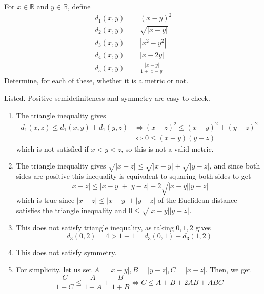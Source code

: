   \begin{exercise}[Rudin 2.11]
    For $x \in \mathbb{R}$ and $y \in \mathbb{R}$, define 
    \begin{align*}
        d_1 (x, y) & = (x - y)^2 \\ 
        d_2 (x, y) & = \sqrt{|x - y|}\\ 
        d_3 (x, y) & = |x^2 - y^2| \\ 
        d_4 (x, y) & = |x - 2y| \\ 
        d_5 (x, y) & = \frac{|x - y|}{1 + |x - y|}
    \end{align*}
    Determine, for each of these, whether it is a metric or not. 
  \end{exercise}
  \begin{solution}
    Listed. Positive semidefiniteness and symmetry are easy to check. 
    \begin{enumerate}
      \item The triangle inequality gives 
      \begin{align}
          d_1 (x, z) \leq d_1 (x, y) + d_1 (y, z) & \iff (x - z)^2 \leq (x - y)^2 + (y - z)^2 \\
                                                  & \iff 0 \leq (x - y) (y - z)
      \end{align}
      which is not satisfied if $x < y < z$, so this is not a valid metric. 
      
      \item The triangle inequality gives $\sqrt{|x - z|} \leq \sqrt{|x - y|} + \sqrt{|y - z|}$, and since both sides are positive this inequality is equivalent to squaring both sides to get 
        \begin{equation}
          |x - z| \leq |x - y| + |y - z| + 2 \sqrt{|x - y| |y - z|}
        \end{equation}
        which is true since $|x - z| \leq |x - y| + |y - z|$ of the Euclidean distance satisfies the triangle inequality and $0 \leq \sqrt{|x - y| |y - z|}$. 
      
      \item This does not satisfy triangle inequality, as taking $0, 1, 2$ gives 
        \begin{equation}
          d_3 (0, 2) = 4 > 1 + 1 = d_3 (0, 1) + d_3 (1, 2)
        \end{equation}
      
      \item This does not satisfy symmetry. 
      
      \item For simplicity, let us set $A = |x - y|, B = |y - z|, C = |x - z|$. Then, we get 
        \begin{equation}
          \frac{C}{1 + C} \leq \frac{A}{1 + A} + \frac{B}{1 + B} \iff C \leq A + B + 2 AB + ABC
        \end{equation}


\end{enumerate}
\end{solution}
